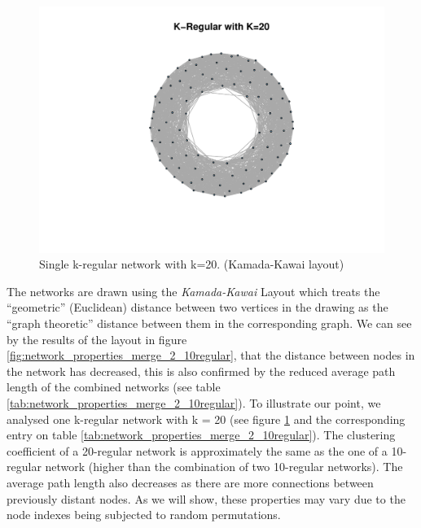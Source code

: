 \documentclass[preprint,number]{elsarticle}
\begin{document}
        \begin{figure}
          \includegraphics[width=1\linewidth]{"../analysis/pdf/network_properties_1_20regular"}
          \begin{minipage}{0.7\linewidth}
            \caption{Single k-regular network with k=20. (Kamada-Kawai layout)}
            \label{fig:network_properties_1_20regular}
          \end{minipage}
        \end{figure}

        The networks are drawn using the \textit{Kamada-Kawai} Layout \cite{Kamada19897} which
        treats the ``geometric'' (Euclidean) distance between two vertices in the drawing as the
        ``graph theoretic'' distance between them in the corresponding graph. We can see by the
        results of the layout in figure \ref{fig:network_properties_merge_2_10regular}, that the
        distance between nodes in the network has decreased, this is also confirmed by the reduced
        average path length of the combined networks (see table
        \ref{tab:network_properties_merge_2_10regular}). To illustrate our point, we analysed one
        k-regular network with k = 20 (see figure \ref{fig:network_properties_1_20regular} and the
        corresponding entry on table \ref{tab:network_properties_merge_2_10regular}). The clustering
        coefficient of a 20-regular network is approximately the same as the one of a 10-regular
        network (higher than the combination of two 10-regular networks). The average path length
        also decreases as there are more connections between previously distant nodes. As we will
        show, these properties may vary due to the node indexes being subjected to random
        permutations.
\end{document}
